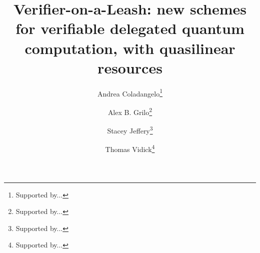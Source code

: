 \begin{frontmatter}%


\title{Verifier-on-a-Leash: new schemes for verifiable delegated quantum computation, with quasilinear resources}




\author[coladangelo]{Andrea Coladangelo\thanks{Supported by...}}
\author[grilo]{Alex B. Grilo\thanks{Supported by...}}
\author[jeffery]{Stacey Jeffery\thanks{Supported by...}}
\author[vidick]{Thomas Vidick\thanks{Supported by...}}

\begin{abstract}

\end{abstract}

\iffalse %

\tocarxivcategory{quantu-ph,cs.CC,cs.CR}

\fi %

\end{frontmatter}

